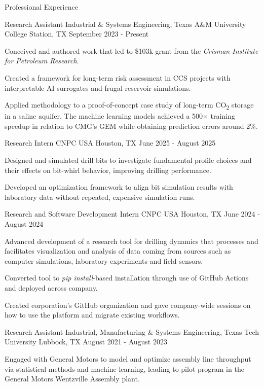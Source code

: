 \begin{cvcontentsection}{Professional Experience}

\begin{cvjob}
    {Research Assistant}
    {Industrial \& Systems Engineering, Texas A\&M University}
    {College Station, TX}
    {September 2023 - Present}
    \item Conceived and authored work that led to \$103k grant from the \textit{Crisman Institute for Petroleum Research}.
    \item Created a framework for long-term risk assessment in CCS projects with interpretable AI surrogates and frugal reservoir simulations.
    \item Applied methodology to a proof-of-concept case study of long-term CO\textsubscript{2} storage in a saline aquifer.
    The machine learning models achieved a 500\( \times \) training speedup in relation to CMG's GEM while obtaining prediction errors around 2\%.
\end{cvjob}

\begin{cvjob}
    {Research Intern}
    {CNPC USA}
    {Houston, TX}
    {June 2025 - August 2025}
    \item Designed and simulated drill bits to investigate fundamental profile choices and their effects on bit-whirl behavior, improving drilling performance.
    \item Developed an optimization framework to align bit simulation results with laboratory data without repeated, expensive simulation runs.
\end{cvjob}

\begin{cvjob}
    {Research and Software Development Intern}
    {CNPC USA}
    {Houston, TX}
    {June 2024 - August 2024}
    \item Advanced development of a research tool for drilling dynamics that processes and facilitates visualization and analysis of data coming from sources such as computer simulations, laboratory experiments and field sensors.
    \item Converted tool to \textit{pip install}-based installation through use of GitHub Actions and deployed across company.
    \item Created corporation's GitHub organization and gave company-wide sessions on how to use the platform and migrate existing workflows.
\end{cvjob}

\begin{cvjob}
    {Research Assistant}
    {Industrial, Manufacturing \& Systems Engineering, Texas Tech University}
    {Lubbock, TX}
    {August 2021 - August 2023}
    \item Engaged with General Motors to model and optimize assembly line throughput via statistical methods and machine learning, leading to pilot program in the General Motors Wentzville Assembly plant.
\end{cvjob}


\end{cvcontentsection}
